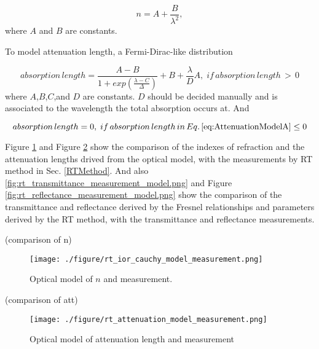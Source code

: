 \begin{equation}
\label{eq:Chauchy}
n = A + \frac{B}{\lambda^2},
\end{equation}
where $A$ and $B$ are constants.


To model attenuation length, a Fermi-Dirac-like distribution


\begin{equation}
\label{eq:AttenuationModelA}
absorption\,length = {\frac{A - B}{1 + exp(\frac{\lambda - C}{\Delta})}} + B + {\frac{\lambda}{D}}A,\;if\,absorption\,length\,>\,0
\end{equation}
where $A$,$B$,$C$,and $D$ are constants. $D$ should be decided manually and is associated to the wavelength the total
absorption occurs at. And


\begin{equation}
\label{eq:AttenuationModelB}
absorption\,length = 0,\;if\,absorption\,length\,in\,Eq.\,\ref{eq:AttenuationModelA}\leq0
\end{equation}


Figure \ref{fig:rt_ior_cauchy_model_measurement.png} and Figure \ref{fig:rt_attenuation_model_measurement.png} show the comparison of the indexes of refraction and the attenuation lengths drived from the
optical model, with the measurements by RT method in Sec. \ref{RTMethod}.
And also \ref{fig:rt_transmittance_measurement_model.png} and Figure \ref{fig:rt_reflectance_measurement_model.png} show the comparison of the transmittance
and reflectance derived by the Fresnel relationships and parameters derived by the RT method, with the transmittance and reflectance measurements.




(comparison of n)
\begin{figure}[h]
    \centering
    \texttt{[image: ./figure/rt\_ior\_cauchy\_model\_measurement.png]}
    \caption[Optical model of $n$ and measurement]{Optical model of $n$ and measurement.}
    \label{fig:rt_ior_cauchy_model_measurement.png}
    \end{figure}



(comparison of att)
\begin{figure}[h]
    \centering
    \texttt{[image: ./figure/rt\_attenuation\_model\_measurement.png]}
    \caption[Optical model of attenuation length and measurement]{Optical model of attenuation length and measurement}
    \label{fig:rt_attenuation_model_measurement.png}
    \end{figure}



